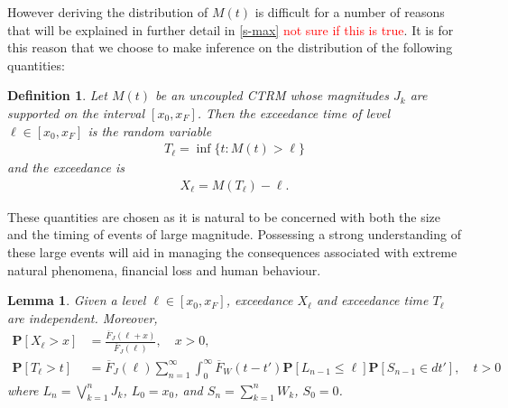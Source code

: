 \documentclass[honours,12pt]{UNSWthesis}
\newcommand{\pr}{\mathbf {P}}
\newcommand{\1}{\mathbf 1}
\newtheorem{lemma}[theorem]{Lemma}
\newtheorem{definition}[theorem]{Definition}
\numberwithin{equation}{section}
\theoremstyle{definition}
\theoremstyle{remark}
\begin{document}
However deriving the distribution of $M(t)$ is difficult for a number of reasons that will be explained in further detail in \ref{s-max} \textcolor{red}{not sure if this is true}. It is for this reason that we choose to make inference on the distribution of the following quantities:
\begin{definition}
Let $M(t)$ be an uncoupled CTRM whose magnitudes $J_k$ are supported on the interval
$[x_0, x_F]$.  Then the exceedance time of level $\ell \in [x_0,x_F]$ is
the random variable
\begin{align*}
T_\ell = \inf\{t: M(t) > \ell\}
\end{align*}
and the exceedance is 
\begin{align*}
X_\ell = M(T_\ell) - \ell.
\end{align*}
\end{definition}
These quantities are chosen as it is natural to be concerned with both the size and the timing of events of large magnitude. Possessing a strong understanding of these large events will aid in managing the consequences associated with extreme natural phenomena, financial loss and human behaviour.
\begin{lemma}
Given a level $\ell \in [x_0,x_F]$, exceedance $X_\ell$ and exceedance time
$T_\ell$ are independent. Moreover, 
\begin{align*}
\pr[X_\ell > x]
&= \frac{\overline F_J(\ell + x)}{\overline F_J(\ell)}, \quad x > 0,
\\
\pr[T_\ell > t]
&= \overline F_J(\ell) \sum_{n=1}^\infty \int_0^\infty \overline F_W(t-t') \pr[L_{n-1} \le \ell]
\pr[S_{n-1} \in dt'], \quad t > 0
\end{align*}
where $L_n = \bigvee_{k=1}^n J_k$, $L_0 = x_0$, and $S_n = \sum_{k=1}^n W_k$,
$S_0 = 0$.
\end{lemma}
\end{document}
